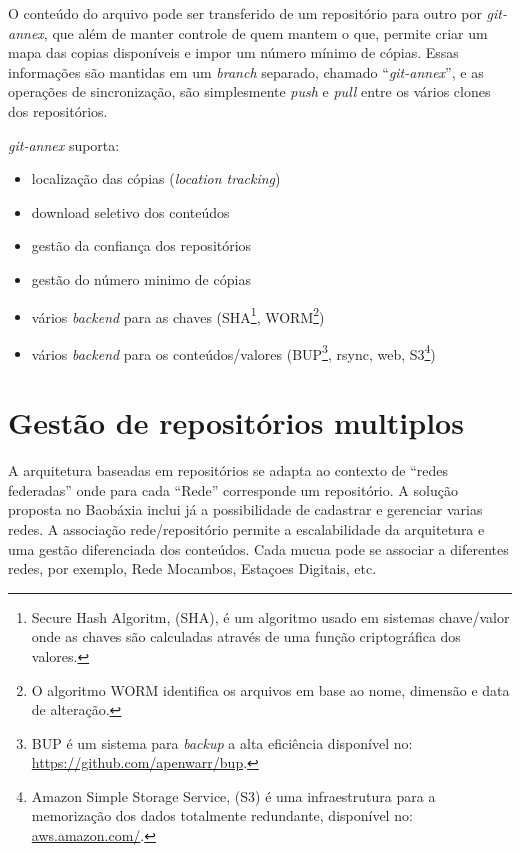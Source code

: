 O conteúdo do arquivo pode ser transferido de um repositório para
outro por \emph{git-annex}, que além de manter controle de quem mantem
o que, permite criar um mapa das copias disponíveis e impor um número
mínimo de cópias. Essas informações são mantidas em um \emph{branch}
separado, chamado ``\emph{git-annex}'', e as operações de
sincronização, são simplesmente \emph{push} e \emph{pull} entre os
vários clones dos repositórios.

\emph{git-annex} suporta:
\begin{itemize}
\item localização das cópias (\emph{location tracking})
\item download seletivo dos conteúdos 
\item gestão da confiança dos repositórios
\item gestão do número minimo de cópias
\item vários \emph{backend} para as chaves (SHA\footnote{Secure Hash
    Algoritm, (SHA), é um algoritmo usado em sistemas chave/valor onde
    as chaves são calculadas através de uma função criptográfica dos
    valores.}, WORM\footnote{O algoritmo WORM identifica os arquivos
    em base ao nome, dimensão e data de alteração.})
\item vários \emph{backend} para os conteúdos/valores
  (BUP\footnote{BUP é um sistema para \emph{backup} a alta eficiência
    disponível no: \url{https://github.com/apenwarr/bup}.}, rsync,
  web, S3\footnote{Amazon Simple Storage Service, (S3) é uma
    infraestrutura para a memorização dos dados totalmente redundante,
    disponível no: \url{aws.amazon.com/}.})
\end{itemize}

\section{Gestão de repositórios multiplos}
A arquitetura baseadas em repositórios se adapta ao contexto de
``redes federadas'' onde para cada ``Rede'' corresponde um
repositório. A solução proposta no Baobáxia inclui já a possibilidade
de cadastrar e gerenciar varias redes. A associação rede/repositório
permite a escalabilidade da arquitetura e uma gestão diferenciada dos
conteúdos. Cada mucua pode se associar a diferentes redes, por
exemplo, Rede Mocambos, Estaçoes Digitais, etc.


